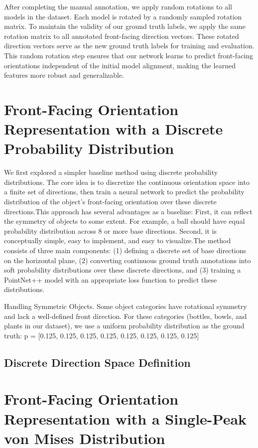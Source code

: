 After completing the manual annotation, we apply random rotations to all models in the dataset. Each model is rotated by a randomly sampled rotation matrix. To maintain the validity of our ground truth labels, we apply the same rotation matrix to all annotated front-facing direction vectors. These rotated direction vectors serve as the new ground truth labels for training and evaluation. This random rotation step ensures that our network learns to predict front-facing orientations independent of the initial model alignment, making the learned features more robust and generalizable.
\section{Front-Facing Orientation Representation with a Discrete Probability Distribution}
We first explored a simpler baseline method using discrete probability distributions. The core idea is to discretize the continuous orientation space into a finite set of directions, then train a neural network to predict the probability distribution of the object's front-facing orientation over these discrete directions.This approach has several advantages as a baseline: First, it can reflect the symmetry of objects to some extent. For example, a ball should have equal probability distribution across 8 or more base directions. Second, it is conceptually simple, easy to implement, and easy to visualize.The method consists of three main components: (1) defining a discrete set of base directions on the horizontal plane, (2) converting continuous ground truth annotations into soft probability distributions over these discrete directions, and (3) training a PointNet++ model with an appropriate loss function to predict these distributions.

Handling Symmetric Objects. Some object categories have rotational symmetry and lack a well-defined front direction. For these categories (bottles, bowls, and plants in our dataset), we use a uniform probability distribution as the ground truth:
p = [0.125, 0.125, 0.125, 0.125, 0.125, 0.125, 0.125, 0.125]
\subsection{Discrete Direction Space Definition}

\section{Front-Facing Orientation Representation with a Single-Peak von Mises Distribution}

